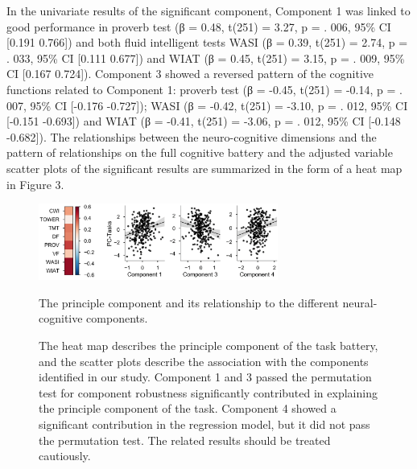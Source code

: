 In the univariate results of the significant component, Component 1 was linked to good performance in proverb test (β = 0.48, t(251) = 3.27, p = . 006, 95\% CI [0.191  0.766]) and both fluid intelligent tests WASI (β = 0.39, t(251) = 2.74, p = . 033, 95\% CI [0.111 0.677]) and WIAT (β = 0.45, t(251) = 3.15, p = . 009, 95\% CI [0.167 0.724]). Component 3 showed a reversed pattern of the cognitive functions related to Component 1: proverb test (β = -0.45, t(251) = -0.14, p = . 007, 95\% CI [-0.176 -0.727]); WASI (β = -0.42, t(251) = -3.10, p = . 012, 95\% CI [-0.151 -0.693]) and WIAT (β = -0.41, t(251) = -3.06, p = . 012, 95\% CI [-0.148 -0.682]). The relationships between the neuro-cognitive dimensions and the pattern of relationships on the full cognitive battery and the adjusted variable scatter plots of the significant results are summarized in the form of a heat map in Figure 3.
\begin{figure}[H]
    \centering
    \includegraphics[width=0.7\textwidth]{study2/image/study2fig4.png}
    \caption{The principle component and its relationship to the different neural-cognitive components.}
    \caption*{
    \scriptsize{The heat map describes the principle component of the task battery, and the scatter plots describe the association with the components identified in our study. Component 1 and 3 passed the permutation test for component robustness significantly contributed in explaining the principle component of the task. Component 4 showed a significant contribution in the regression model, but it did not pass the permutation test. The related results should be treated cautiously.}
    }
    \label{fig:study2:fig4}
\end{figure}
